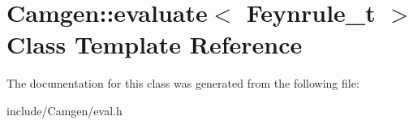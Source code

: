 \hypertarget{a00139}{\section{Camgen\-:\-:evaluate$<$ Feynrule\-\_\-t $>$ Class Template Reference}
\label{a00139}
}


The documentation for this class was generated from the following file\-:\begin{DoxyCompactItemize}
\item 
include/\-Camgen/eval.\-h\end{DoxyCompactItemize}
